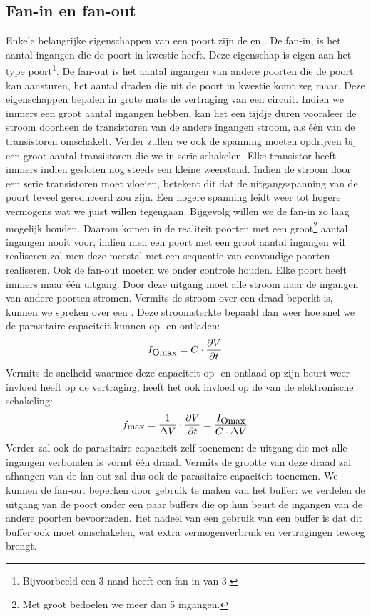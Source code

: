 \subsection{Fan-in en fan-out}
Enkele belangrijke eigenschappen van een poort zijn de  en . De fan-in, is het aantal ingangen die de poort in kwestie heeft. Deze eigenschap is eigen aan het type poort\footnote{Bijvoorbeeld een 3-nand heeft een fan-in van 3.}. De fan-out is het aantal ingangen van andere poorten die de poort kan aansturen, het aantal draden die uit de poort in kwestie komt zeg maar. Deze eigenschappen bepalen in grote mate de vertraging van een circuit. Indien we immers een groot aantal ingangen hebben, kan het een tijdje duren vooraleer de stroom doorheen de transistoren van de andere ingangen stroom, als \'e\'en van de transistoren omschakelt. Verder zullen we ook de spanning moeten opdrijven bij een groot aantal transistoren die we in serie schakelen. Elke transistor heeft immers indien gesloten nog steeds een kleine weerstand. Indien de stroom door een serie transistoren moet vloeien, betekent dit dat de uitgangsspanning van de poort teveel gereduceerd zou zijn. Een hogere spanning leidt weer tot hogere vermogens wat we juist willen tegengaan. Bijgevolg willen we de fan-in zo laag mogelijk houden. Daarom komen in de realiteit poorten met een groot\footnote{Met groot bedoelen we meer dan 5 ingangen.} aantal ingangen nooit voor, indien men een poort met een groot aantal ingangen wil realiseren zal men deze meestal met een sequentie van eenvoudige poorten realiseren. Ook de fan-out moeten we onder controle houden. Elke poort heeft immers maar \'e\'en uitgang. Door deze uitgang moet alle stroom naar de ingangen van andere poorten stromen. Vermits de stroom over een draad beperkt is, kunnen we spreken over een . Deze stroomsterkte bepaald dan weer hoe snel we de parasitaire capaciteit kunnen op- en ontladen:
\begin{equation}
I_{\mbox{\small{Omax}}}=C\cdot\displaystyle\frac{\partial V}{\partial t}
\end{equation}
Vermits de snelheid waarmee deze capaciteit op- en ontlaad op zijn beurt weer invloed heeft op de vertraging, heeft het ook invloed op de  van de elektronische schakeling:
\begin{equation}
f_{\mbox{\small{max}}}=\displaystyle\frac{1}{\Delta V}\cdot\displaystyle\frac{\partial V}{\partial t}=\displaystyle\frac{I_{\mbox{\small{Omax}}}}{C\cdot \Delta V}
\end{equation}
Verder zal ook de parasitaire capaciteit zelf toenemen: de uitgang die met alle ingangen verbonden is vormt \'e\'en draad. Vermits de grootte van deze draad zal afhangen van de fan-out zal dus ook de parasitaire capaciteit toenemen. We kunnen de fan-out beperken door gebruik te maken van het buffer: we verdelen de uitgang van de poort onder een paar buffers die op hun beurt de ingangen van de andere poorten bevoorraden. Het nadeel van een gebruik van een buffer is dat dit buffer ook moet omschakelen, wat extra vermogenverbruik en vertragingen teweeg brengt.
